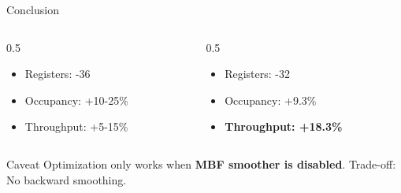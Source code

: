 \documentclass[aspectratio=169, table]{beamer}
\begin{document}
\begin{frame}{Conclusion} %
\begin{columns}[T]
    \begin{column}{0.5\textwidth}
        \begin{tcolorbox}[colback=blue!5, colframe=acadblue, title=Paper Analysis (Theoretical)]
            \begin{itemize}
                \item Registers: -36
                \item Occupancy: +10-25\%
                \item Throughput: +5-15\%
            \end{itemize}
        \end{tcolorbox}
    \end{column}

    \begin{column}{0.5\textwidth}
        \begin{tcolorbox}[colback=green!5, colframe=acadgreen, title=Real Hardware (sm\_75)]
            \begin{itemize}
                \item Registers: -32 
                \item Occupancy: +9.3\% 
                \item \textbf{Throughput: +18.3\%} 
            \end{itemize}
        \end{tcolorbox}
    \end{column}
\end{columns}

\vspace{1em}
\begin{block}{Caveat}
    Optimization only works when \textbf{MBF smoother is disabled}. Trade-off: No backward smoothing.
\end{block}
\end{frame}
\end{document}
